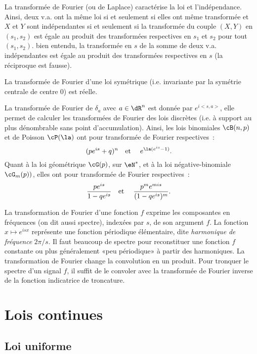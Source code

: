 La transformée de Fourier (ou de Laplace) caractérise la loi et
l'indépendance. Ainsi, deux v.a. ont la même loi si et seulement si elles ont
même transformée et $X$ et $Y$ sont indépendantes si et seulement si la
transformée du couple $(X,Y)$ en $(s_1,s_2)$ est égale au produit des
transformées respectives en $s_1$ et $s_2$ pour tout $(s_1,s_2)$. bien
entendu, la transformée en $s$ de la somme de deux v.a. indépendantes est
égale au produit des transformées respectives en $s$ (la réciproque est
fausse).

La transformée de Fourier d'une loi symétrique (i.e. invariante par la
symétrie centrale de centre $0$) est réelle.

La transformée de Fourier de $\delta_a$ avec $a\in\dR^n$ est donnée par
$e^{i<s,a>}$, elle permet de calculer les transformées de Fourier des lois
discrètes (i.e. à support au plus dénombrable sans point d'accumulation).
Ainsi, les lois binomiales $\cB(n,p)$ et de Poisson $\cP(\la)$ ont pour
transformée de Fourier respectives~:
$$
(pe^{is}+q)^n
\text{\quad et \quad}
e^{\la(e^{is}-1)}.
$$
Quant à la loi géométrique $\cG(p)$, sur $\eN^*$, et à la loi
négative-binomiale $\cG_m(p))$, elles ont pour transformée de Fourier
respectives~:
$$
\frac{pe^{is}}{1-qe^{is}}
\text{\quad et \quad}
\frac{p^me^{mis}}{(1-qe^{is})^m}.
$$

\begin{eur}[Transformation de Fourier = analyse en fréquences]
  La transformation de Fourier d'une fonction $f$ exprime les composantes en
  fréquences (on dit aussi spectre), indexées par $s$, de son argument $f$.
  La fonction $x\mapsto e^{isx}$ représente une fonction périodique
  élémentaire, dite \emph{harmonique de fréquence} $2\pi/s$. Il faut beaucoup
  de spectre pour reconstituer une fonction $f$ constante ou plus généralement
  «peu périodique» à partir des harmoniques.  La transformation de Fourier
  change la convolution en un produit.  Pour tronquer le spectre d'un signal
  $f$, il suffit de le convoler avec la transformée de Fourier inverse de la
  fonction indicatrice de troncature.
\end{eur}

%
\section{Lois continues}
%

%
\subsection{Loi uniforme}\label{ss:loi:uniforme}
%

